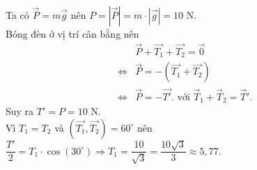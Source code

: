\begin{bt}
{\begin{center}
		\end{center}
		Ta  có $\overrightarrow{P}=m\overrightarrow{g}$ nên $P=\left|\overrightarrow{P}\right|=m\cdot\left|\overrightarrow{g}\right|=10$ N.\\
		Bóng đèn ở vị trí cân bằng nên 
		\begin{eqnarray*}
			&  &\overrightarrow{P}+\overrightarrow{T_1}+\overrightarrow{T_2}=\overrightarrow{0}\\
			&\Leftrightarrow& \overrightarrow{P}=-\left(\overrightarrow{T_1}+\overrightarrow{T_2}\right)\\ 
			&\Leftrightarrow&  \overrightarrow{P}=-\overrightarrow{T'}.\text{ với }\overrightarrow{T}_1+\overrightarrow{T}_2=\overrightarrow{T}'.
		\end{eqnarray*}
		Suy ra $T'=P=10$ N. \\ 
		Vì $T_1=T_2$ và $\left(\overrightarrow{T_1},\overrightarrow{T_2}\right)=60^{\circ}$  nên
		$\dfrac{T'}{2}=T_1\cdot \cos\left(30^{\circ}\right)\Rightarrow T_1=\dfrac{10}{\sqrt{3}}=\dfrac{10\sqrt{3}}{3}\approx  5{,}77$.
	} 
\end{bt}

